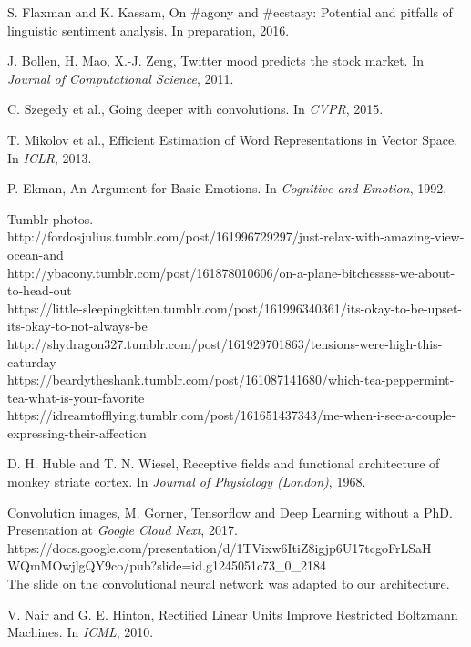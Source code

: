 \begin{thebibliography}{999}

S. Flaxman and K. Kassam, On \#agony and \#ecstasy: Potential and pitfalls of linguistic sentiment analysis. In preparation, 2016.

J. Bollen, H. Mao, X.-J. Zeng, Twitter mood predicts the stock market. In \textit{Journal of Computational Science}, 2011.

C. Szegedy et al., Going deeper with convolutions. In \textit{CVPR}, 2015.

T. Mikolov et al., Efficient Estimation of Word Representations in Vector Space. In \textit{ICLR}, 2013.

P. Ekman, An Argument for Basic Emotions. In \textit{Cognitive and Emotion}, 1992.

Tumblr photos.\\
http://fordosjulius.tumblr.com/post/161996729297/just-relax-with-amazing-view-ocean-and\\
http://ybacony.tumblr.com/post/161878010606/on-a-plane-bitchessss-we-about-to-head-out\\
https://little-sleepingkitten.tumblr.com/post/161996340361/its-okay-to-be-upset-its-okay-to-not-always-be\\
http://shydragon327.tumblr.com/post/161929701863/tensions-were-high-this-caturday\\
https://beardytheshank.tumblr.com/post/161087141680/which-tea-peppermint-tea-what-is-your-favorite\\
https://idreamtofflying.tumblr.com/post/161651437343/me-when-i-see-a-couple-expressing-their-affection

D. H. Huble and T. N. Wiesel, Receptive fields and functional architecture of monkey striate cortex. In \textit{Journal of Physiology (London)}, 1968.

Convolution images, M. Gorner, Tensorflow and Deep Learning without a PhD. Presentation at \textit{Google Cloud Next}, 2017.\\ 
https://docs.google.com/presentation/d/1TVixw6ItiZ8igjp6U17tcgoFrLSaH\\WQmMOwjlgQY9co/pub?slide=id.g1245051c73\_0\_2184\\
The slide on the convolutional neural network was adapted to our architecture.

V. Nair and G. E. Hinton, Rectified Linear Units Improve Restricted Boltzmann Machines. In \textit{ICML}, 2010.


\end{thebibliography}
